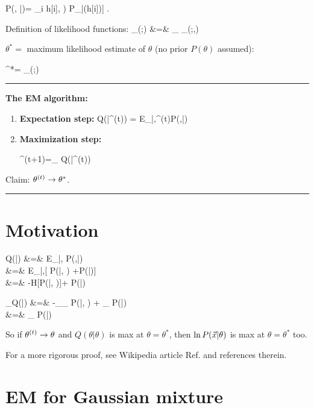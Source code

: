 \beq
P(\vecx, \vech|\theta)=
\prod_i \left[P_{\rvx|\rvh,\ul{\theta}}
(x[i]\cond h[i], \theta)
P_{\rvh|\ul{\theta}}(h[i]\cond \theta)\right]
\;.
\eeq

Definition of likelihood functions:
\beqa
{}
_{\call(\theta;\vecx)}
&=&
\sum_{\vech}
_{\call(\theta;\vecx,\vech)}
\eeqa


$\theta^*=$ maximum likelihood
estimate of $\theta$ (no prior $P(\theta)$
assumed):

\beq
\theta^*=
\argmax_\theta\call(\theta;\vecx)
\eeq

\hrule\noindent
{\bf The EM algorithm:}
\begin{enumerate}
\item{\bf Expectation step:} 
\beq
Q(\theta|\theta^{(t)})
=
E_{\vech|\vecx,\theta^{(t)}}\ln P(\vecx,\vech|\theta)
\eeq

\item{\bf Maximization step:}

\beq
\theta^{(t+1)}=\argmax_\theta
Q(\theta|\theta^{(t)})
\eeq
\end{enumerate}
Claim: $\theta^{(t)}\rightarrow \theta^*$.

\;
\hrule
\section*{Motivation}

\beqa
Q(\theta|\theta)
&=&
E_{\vech|\vecx,\theta}
\ln P(\vecx,\vech|\theta)
\\
&=&
E_{\vech|\vecx,\theta}[
\ln P(\vech|\vecx, \theta) 
+\ln P(\vecx|\theta)]
\\
&=&
-H[P(\ul{\vech}|\vecx, \theta)]+
\ln P(\vecx|\theta)
\eeqa

\beqa
\partial_\theta Q(\theta|\theta)
&=&
-\sum_{\vech}\partial_\theta
P(\ul{\vech}|\vecx, \theta)
+
\partial_\theta
\ln P(\vecx|\theta)
\\
&=&
\partial_\theta
\ln P(\vecx|\theta)
\eeqa

So if $\theta^{(t)}\rightarrow \theta$
and $Q(\theta|\theta)$ is max at $\theta=\theta^*$,
then $\ln P({\vec{x}}|\theta)$
is max at $\theta=\theta^*$ too.

For a  more rigorous proof,
see Wikipedia article Ref.\cite{wiki-em}
and references therein.

\section*{EM for Gaussian mixture}

